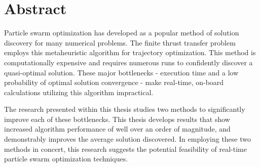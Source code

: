
\cleardoublepage
\thispagestyle{empty} %

\chapter*{Abstract} %

\noindent Particle swarm optimization has developed as a popular method of solution 
discovery for many numerical problems. The finite thrust transfer problem employs
this metaheuristic algorithm for trajectory optimization.  This method is computationally expensive and requires
numerous runs to confidently discover a quasi-optimal solution. These major bottlenecks - execution time and 
a low probability of optimal solution convergence - make real-time, on-board calculations utilizing this algorithm 
impractical. \newline

\noindent The research presented within this thesis studies two methods to significantly improve each of these bottlenecks.
This thesis develops results that show increased algorithm performance of well over an order of magnitude, and demonstrably
improves the average solution discovered. In employing these two methods in concert, this
research suggests the potential feasibility of real-time particle swarm optimization techniques.\newline

\cleardoublepage
